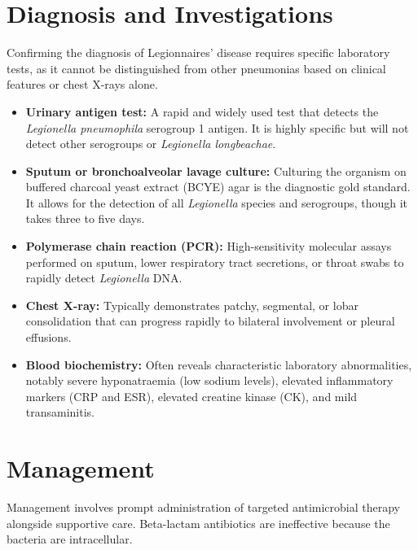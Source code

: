 \section*{Diagnosis and Investigations}
Confirming the diagnosis of Legionnaires' disease requires specific laboratory tests, as it cannot be distinguished from other pneumonias based on clinical features or chest X-rays alone.

\begin{itemize}
    \item \textbf{Urinary antigen test:} A rapid and widely used test that detects the \textit{Legionella pneumophila} serogroup 1 antigen. It is highly specific but will not detect other serogroups or \textit{Legionella longbeachae}.
    \item \textbf{Sputum or bronchoalveolar lavage culture:} Culturing the organism on buffered charcoal yeast extract (BCYE) agar is the diagnostic gold standard. It allows for the detection of all \textit{Legionella} species and serogroups, though it takes three to five days.
    \item \textbf{Polymerase chain reaction (PCR):} High-sensitivity molecular assays performed on sputum, lower respiratory tract secretions, or throat swabs to rapidly detect \textit{Legionella} DNA.
    \item \textbf{Chest X-ray:} Typically demonstrates patchy, segmental, or lobar consolidation that can progress rapidly to bilateral involvement or pleural effusions.
    \item \textbf{Blood biochemistry:} Often reveals characteristic laboratory abnormalities, notably severe hyponatraemia (low sodium levels), elevated inflammatory markers (CRP and ESR), elevated creatine kinase (CK), and mild transaminitis.
\end{itemize}

\section*{Management}
Management involves prompt administration of targeted antimicrobial therapy alongside supportive care. Beta-lactam antibiotics are ineffective because the bacteria are intracellular.

